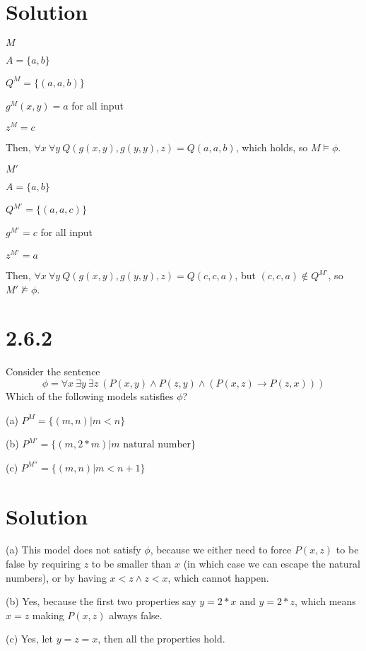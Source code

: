 \documentclass[10pt]{article}
\begin{document}
\section*{Solution}
\begin{description*}
\item $M$
\item $A = \{a,b\}$
\item $Q^{M} = \{(a,a,b)\}$
\item $g^{M}(x,y) = a$ for all input
\item $z^{M} = c$
\end{description*}
Then, $\forall x\ \forall y\ Q(g(x,y),g(y,y),z)=Q(a,a,b)$, which holds, so $M \models \phi$.
\begin{description*}
\item $M'$
\item $A = \{a,b\}$
\item $Q^{M'} = \{(a,a,c)\}$
\item $g^{M'} = c$ for all input
\item $z^{M'} = a$
\end{description*}
Then, $\forall x\ \forall y\ Q(g(x,y),g(y,y),z) = Q(c,c,a)$, but $(c,c,a) \not \in Q^{M'}$, so $M' \not \models \phi$.
\section*{2.6.2}
Consider the sentence
\[
\phi = \forall x\ \exists y\ \exists z\ (P(x,y)\land P(z,y) \land (P(x,z)\to P(z,x)))
\]
Which of the following models satisfies $\phi$?
\begin{description*}
\item[(a)] $P^M = \{ (m,n) | m < n \}$
\item[(b)] $P^{M'} = \{ (m,2*m) | m \text{ natural number} \}$ 
\item[(c)] $P^{M''} = \{ (m,n) | m < n + 1\}$
\end{description*}
\section*{Solution}
\begin{description*}
\item[(a)] This model does not satisfy $\phi$, because we either need to force $P(x,z)$ to be false by requiring $z$ to be smaller than $x$ (in which case we can escape the natural numbers), or by having $x<z \land z<x$, which cannot happen.
\item[(b)] Yes, because the first two properties say $y=2*x$ and $y=2*z$, which means $x=z$ making $P(x,z)$ always false.
\item[(c)] Yes, let $y=z=x$, then all the properties hold.
\end{description*}
\end{document}
